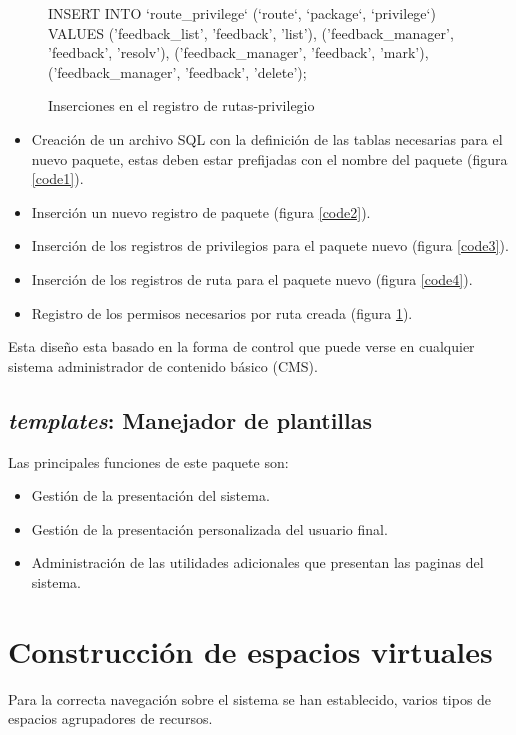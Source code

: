 \begin{figure}
\centering
\begin{SQL}
INSERT INTO `route_privilege`
(`route`, `package`, `privilege`)
VALUES
('feedback_list',    'feedback', 'list'),
('feedback_manager', 'feedback', 'resolv'),
('feedback_manager', 'feedback', 'mark'),
('feedback_manager', 'feedback', 'delete');
\end{SQL}
\caption{Inserciones en el registro de rutas-privilegio}
\label{code5}
\end{figure}

\begin{itemize}
\item Creación de un archivo SQL con la definición de las tablas necesarias para
el nuevo paquete, estas deben estar prefijadas con el nombre del paquete
(figura \ref{code1}).
\item Inserción un nuevo registro de paquete (figura \ref{code2}).
\item Inserción de los registros de privilegios para el paquete nuevo
(figura \ref{code3}).
\item Inserción de los registros de ruta para el paquete nuevo
(figura \ref{code4}).
\item Registro de los permisos necesarios por ruta creada
(figura \ref{code5}).
\end{itemize}

Esta diseño esta basado en la forma de control que puede verse en cualquier
sistema administrador de contenido básico (CMS).

\subsection{\emph{templates}: Manejador de plantillas}
Las principales funciones de este paquete son:

\begin{itemize}
\item Gestión de la presentación del sistema.
\item Gestión de la presentación personalizada del usuario final.
\item Administración de las utilidades adicionales que presentan las paginas
del sistema.
\end{itemize}

\section{Construcción de espacios virtuales}
Para la correcta navegación sobre el sistema se han establecido, varios tipos de
espacios agrupadores de recursos.

